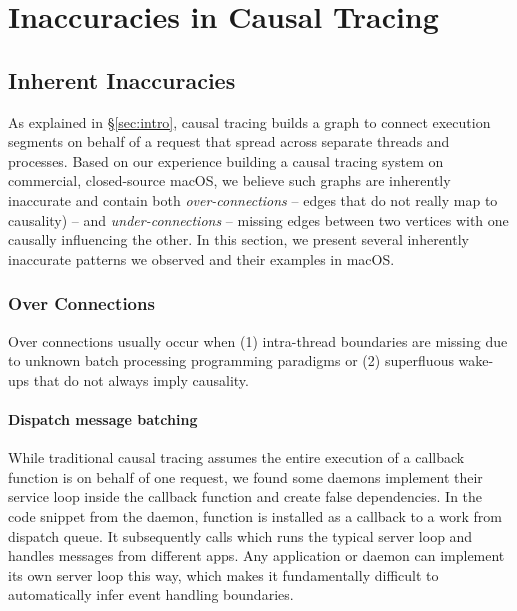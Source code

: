 \section{Inaccuracies in Causal Tracing}\label{sec:inaccuracy}

\subsection{Inherent Inaccuracies}


As explained in \S\ref{sec:intro}, causal tracing builds a graph to connect
execution segments on behalf of a request that spread across separate threads
and processes. Based on our experience building a causal tracing system
on commercial, closed-source macOS, we believe such graphs are inherently
inaccurate and contain both \emph{over-connections} -- edges that do not really
map to causality) -- and \emph{under-connections} -- missing edges between two
vertices with one causally influencing the other. In this section, we present
several inherently inaccurate patterns we observed and their examples in macOS.

\subsubsection{Over Connections} \label{subsec:overconnections}

Over connections usually occur when (1) intra-thread boundaries are missing due
to unknown batch processing programming paradigms or (2) superfluous wake-ups
that do not always imply causality.

\paragraph{Dispatch message batching}

While traditional causal tracing assumes the entire execution of a callback
function is on behalf of one request, we found some daemons implement their
service loop inside the callback function and create false dependencies. In the
code snippet from the  daemon, function 
is installed as a callback to a work from dispatch queue. It subsequently calls
 which runs the typical server loop and handles
messages from different apps.
Any application or daemon can implement its own server loop
this way, which makes it fundamentally difficult to automatically infer event
handling boundaries.

